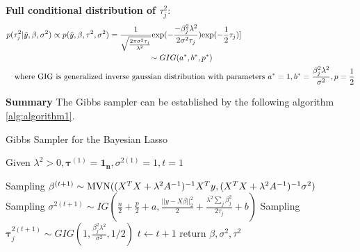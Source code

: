 \textbf{Full conditional distribution of $\tau_j^2$}:
\begin{equation}
	\begin{multlined}
		p(\tau_j^2|\tilde{y},\beta,\sigma^2) \propto  	p(\tilde{y},\beta,\tau^2,\sigma^2)  
		= \frac{1}{\sqrt{\frac{2\pi\sigma^2\tau_j}{\lambda^2}}}\textnormal{exp}(-\frac{-\beta_j^2\lambda^2}{2\sigma^2\tau_j})\textnormal{exp}(-\frac{1}{2}\tau_j)]\\
		\sim GIG(a^*,b^*,p^*)\\
		\textnormal{where GIG is generalized inverse gaussian distribution with parameters } a^* = 1, b^* = \frac{\beta_j^2\lambda^2}{\sigma^2}, p = \frac{1}{2}
	\end{multlined}
\end{equation}

\textbf{Summary}
The Gibbs sampler can be established by the following algorithm \autoref{alg:algorithm1}.
\begin{algorithm}
	\caption{Gibbs Sampler for the Bayesian Lasso}
	\begin{algorithmic}[1]
		
		\State Given $\lambda^2>0, \mathbf{\tau}^{(1)} = \mathbf{1_n}, \sigma^{2(1)} =1 , t=1$ 
		
		\State Sampling $\mathbf{\beta}^{(t+1)} \sim \textnormal{MVN}((X^TX+\lambda^2A^{-1})^{-1}X^Ty,(X^TX+\lambda^2A^{-1})^{-1}\sigma^2) $  
		\State Sampling $\sigma^{2(t+1)} \sim IG(\frac{n}{2}+\frac{p}{2}+a,\frac{||y-X\beta||_2^2}{2}+\frac{\lambda^2\sum_j{\beta_j^2}}{2\tau_j}+b)$ 
		\State Sampling $\mathbf{\tau}_j^{2(t+1)} \sim GIG(1,\frac{\beta_j^2\lambda^2}{\sigma^2},1/2)$ 
		\EndFor
		\State $t \leftarrow t + 1$
		\EndWhile  \label{roy's loop}
		\State return $\beta,\sigma^2,\tau^2$
		
		
	\end{algorithmic}
	\label{alg:algorithm1}
\end{algorithm}

